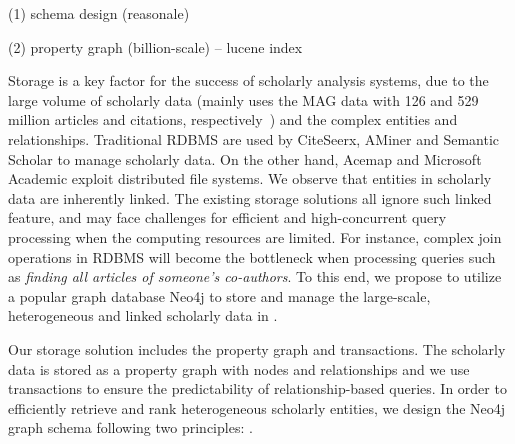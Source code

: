 (1) schema design (reasonale)

(2) property graph (billion-scale) -- lucene index

Storage is a key factor for the success of scholarly analysis systems, due to the large volume of scholarly data (\eg \oursystem mainly uses the MAG data with 126 and 529 million articles and citations, respectively~\cite{sinha2015overview}) and the complex entities and relationships.
%
Traditional RDBMS are used by CiteSeerx, AMiner and Semantic Scholar to manage scholarly data. On the other hand, Acemap and Microsoft Academic exploit distributed file systems.
%
We observe that entities in scholarly data are inherently linked. The existing storage solutions all ignore such linked feature, and may face challenges for efficient and high-concurrent query processing when the computing resources are limited. For instance, complex join operations in RDBMS will become the bottleneck when processing queries such as {\em finding all articles of someone's co-authors}.
%
To this end, we propose to utilize a popular graph database Neo4j to store and manage the large-scale, heterogeneous and linked scholarly data in \oursystem.


Our storage solution includes the property graph and transactions. The scholarly data is stored as a property graph with nodes and relationships and we use transactions to ensure the predictability of relationship-based queries. 
In order to efficiently retrieve and rank heterogeneous scholarly entities, we design the Neo4j graph schema following two principles: .

